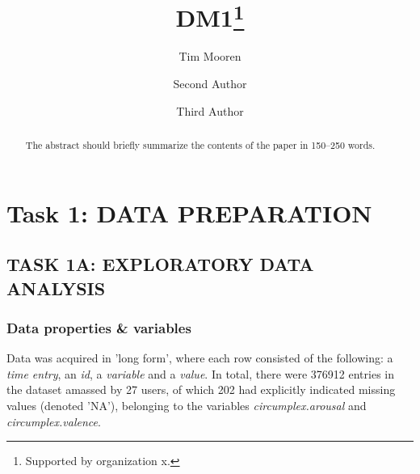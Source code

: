 \documentclass[runningheads]{llncs}
\begin{document}
%
\title{DM1\thanks{Supported by organization x.}}
%
%
\author{Tim Mooren \and
Second Author \and
Third Author}
%
%
%
\maketitle              %
%
\begin{abstract}
The abstract should briefly summarize the contents of the paper in
150--250 words.

\end{abstract}
%
%
%
\section{Task 1: DATA PREPARATION}

\subsection{TASK 1A: EXPLORATORY DATA ANALYSIS}

\subsubsection{Data properties \& variables} 
\phantom
\smallskip



Data was acquired in 'long form', where each row consisted of the following: a \textit{time entry}, an \textit{id}, a \textit{variable} and a \textit{value}. In total, there were 376912 entries in the dataset amassed by 27 users, of which 202 had explicitly indicated missing values (denoted 'NA'), belonging to the variables \textit{circumplex.arousal} and \textit{circumplex.valence}. \\
\end{document}
